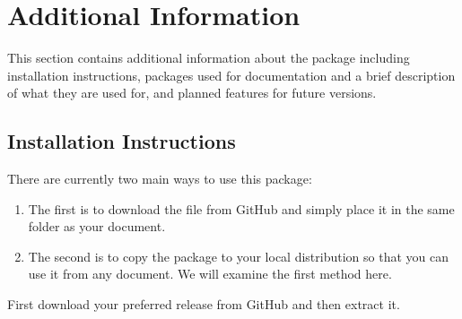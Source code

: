 \section{Additional Information}
\label{sec:addinfo}
This section contains additional information about the package including installation instructions, packages used for documentation and a brief description of what they are used for, and planned features for future versions.

\subsection{Installation Instructions}
\label{sec:install}
There are currently two main ways to use this package:
\begin{enumerate}
    \item The first is to download the  file from GitHub and simply place it in the same folder as your document. 
    \item The second is to copy the package to your local distribution so that you can use it from any document. We will examine the first method here.
\end{enumerate}

First download your preferred release from GitHub and then extract it.

